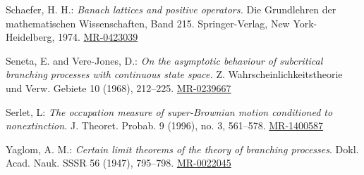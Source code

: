 \documentclass[12pt,a4paper]{amsart}
\numberwithin{equation}{section}
\theoremstyle{plain}
\theoremstyle{definition}
\theoremstyle{remark}
\def\MR#1{\href{http://www.ams.org/mathscinet-getitem?mr=#1}{MR-#1}}
\begin{document}
\begin{thebibliography}{99}
	Schaefer, H. H.:
	\emph{Banach lattices and positive operators.}
	Die Grundlehren der mathematischen Wissenschaften, Band 215. Springer-Verlag, New York-Heidelberg, 1974.
	\MR{0423039}

	
	Seneta, E. and Vere-Jones, D.:
	\emph{On the asymptotic behaviour of subcritical branching processes with continuous state space.}
	Z. Wahrscheinlichkeitstheorie und Verw. Gebiete 10 (1968),
	212--225.
	\MR{0239667}
	
	Serlet, L:
	\emph{The occupation measure of super-Brownian motion conditioned to nonextinction.}
	J. Theoret. Probab. 9 (1996), no. 3, 561--578.
	\MR{1400587}

	Yaglom, A. M.: \emph{Certain limit theorems of the theory of branching processes}. Dokl. Acad.
	Nauk. SSSR 56 (1947), 795--798.
	\MR{0022045}

\end{thebibliography}
\end{document}
